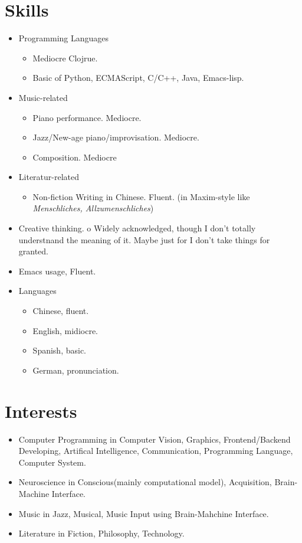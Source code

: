 \documentclass[11pt]{article}
\begin{document}
\section{Skills}
\label{sec:org33cb4ee}
\begin{itemize}
\item Programming Languages
\begin{itemize}
\item Mediocre Clojrue.
\item Basic of Python, ECMAScript, C/C++, Java, Emacs-lisp.
\end{itemize}
\item Music-related
\begin{itemize}
\item Piano performance. Mediocre.
\item Jazz/New-age piano/improvisation. Mediocre.
\item Composition. Mediocre
\end{itemize}
\item Literatur-related
\begin{itemize}
\item Non-fiction Writing in Chinese. Fluent.
(in Maxim-style like \emph{Menschliches, Allzumenschliches})
\end{itemize}
\item Creative thinking.
o
Widely acknowledged, though I don't totally understnand the meaning of it.
Maybe just for I don't take things for granted.
\item Emacs usage, Fluent.
\item Languages
\begin{itemize}
\item Chinese, fluent.
\item English, midiocre.
\item Spanish, basic.
\item German, pronunciation.
\end{itemize}
\end{itemize}
\section{Interests}
\label{sec:org22d902e}
\begin{itemize}
\item Computer Programming
in Computer Vision, Graphics, Frontend/Backend Developing, Artifical Intelligence, Communication, Programming Language, Computer System.
\item Neuroscience
in Conscious(mainly computational model), Acquisition, Brain-Machine Interface.
\item Music
in Jazz, Musical, Music Input using Brain-Mahchine Interface.
\item Literature
in Fiction, Philosophy, Technology.
\end{itemize}
\end{document}
